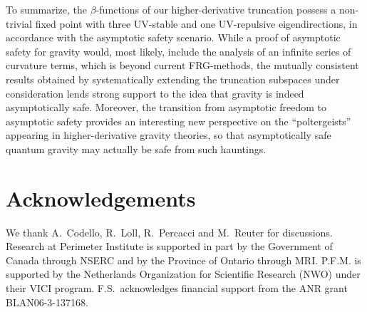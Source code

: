 \documentclass[11pt,reqno]{article}
\newcommand{\2}{\sqrt{2\,}}
\begin{document}
To summarize, the $\beta$-functions of our higher-derivative truncation possess a non-trivial fixed point with three UV-stable and one UV-repulsive eigendirections, in accordance with the asymptotic safety scenario. While a proof of asymptotic safety for gravity would, most likely, include the analysis of an infinite series of curvature terms, which is  beyond current FRG-methods, the mutually consistent results obtained by systematically extending the truncation subspaces under consideration lends strong support to the idea that 
gravity is indeed asymptotically safe.
Moreover, the transition from asymptotic freedom to asymptotic safety provides an interesting new perspective on the ``poltergeists'' appearing in higher-derivative gravity theories, so that asymptotically safe quantum gravity may actually be safe from such hauntings.


\section*{Acknowledgements}

We thank A.\ Codello, R.\ Loll, R.\ Percacci and M.\ Reuter for discussions.   
Research at Perimeter Institute is supported in part by the Government of Canada through NSERC and by the Province of Ontario through 
MRI. P.F.M. is supported by the Netherlands Organization for Scientific Research (NWO) under their VICI program. F.S.\ acknowledges 
financial support from the ANR grant BLAN06-3-137168.


\end{document}
